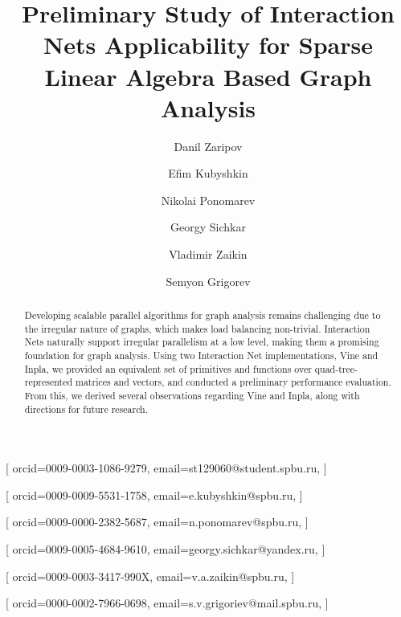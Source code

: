 \documentclass[
]{ceurart}
\begin{document}

\title{Preliminary Study of Interaction Nets Applicability for Sparse Linear Algebra Based Graph Analysis}

\author[1]{Danil Zaripov}[%
orcid=0009-0003-1086-9279,
email=st129060@student.spbu.ru,
]
\cormark[1]

\author[1]{Efim Kubyshkin}[%
orcid=0009-0009-5531-1758,
email=e.kubyshkin@spbu.ru,
]

\author[1]{Nikolai Ponomarev}[%
orcid=0009-0000-2382-5687,
email=n.ponomarev@spbu.ru,
]

\author[1]{Georgy Sichkar}[%
orcid=0009-0005-4684-9610,
email=georgy.sichkar@yandex.ru,
]

\author[1]{Vladimir Zaikin}[%
orcid=0009-0003-3417-990X,
email=v.a.zaikin@spbu.ru,
]

\author[1]{Semyon Grigorev}[%
orcid=0000-0002-7966-0698,
email=s.v.grigoriev@mail.spbu.ru,
]
\cormark[1]


\address[1]{Saint Petersburg State University,
  7-9 Universitetskaya Embankment, St. Petersburg, 199034, Russia}




\begin{abstract}
  Developing scalable parallel algorithms for graph analysis remains challenging due to the irregular nature of graphs, which makes load balancing non-trivial.
  Interaction Nets naturally support irregular parallelism at a low level, making them a promising foundation for graph analysis.
  Using two Interaction Net implementations, Vine and Inpla, we provided an equivalent set of primitives and functions over quad-tree-represented matrices and vectors, and conducted a preliminary performance evaluation.
  From this, we derived several observations regarding Vine and Inpla, along with directions for future research.
\end{abstract}
\end{document}
